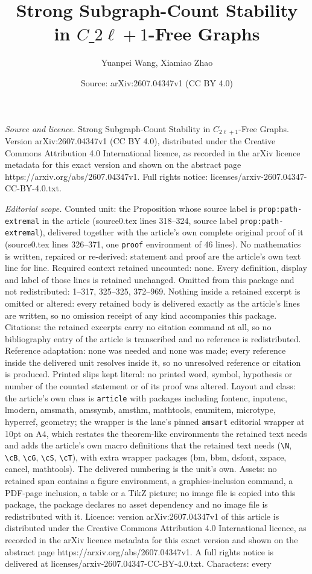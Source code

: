 \documentclass[10pt,a4paper]{amsart}
\title[Strong Subgraph-Count Stability in $C\_{2\ell+1}$-Free Graphs]{Strong Subgraph-Count Stability in $C\_{2\ell+1}$-Free Graphs}
\author{Yuanpei Wang, Xiamiao Zhao}
\date{Source: arXiv:2607.04347v1 (CC BY 4.0)}
\begin{document}
\maketitle

\noindent\emph{Source and licence.} Strong Subgraph-Count Stability in $C_{2\ell+1}$-Free Graphs. Version arXiv:2607.04347v1 (CC BY 4.0), distributed under the Creative Commons Attribution 4.0 International licence, as recorded in the arXiv licence metadata for this exact version and shown on the abstract page https://arxiv.org/abs/2607.04347v1. Full rights notice: licenses/arxiv-2607.04347-CC-BY-4.0.txt.\par\smallskip

\noindent\textit{Editorial scope.} Counted unit: the Proposition whose source label is \texttt{prop:path-extremal} in the article (source0.tex lines 318--324, source label \texttt{prop:path-extremal}), delivered together with the article's own complete original proof of it (source0.tex lines 326--371, one \texttt{proof} environment of 46 lines). No mathematics is written, repaired or re-derived: statement and proof are the article's own text line for line. Required context retained uncounted: none. Every definition, display and label of those lines is retained unchanged. Omitted from this package and not redistributed: 1--317, 325--325, 372--969. Nothing inside a retained excerpt is omitted or altered: every retained body is delivered exactly as the article's lines are written, so no omission receipt of any kind accompanies this package. Citations: the retained excerpts carry no citation command at all, so no bibliography entry of the article is transcribed and no reference is redistributed. Reference adaptation: none was needed and none was made; every reference inside the delivered unit resolves inside it, so no unresolved reference or citation is produced. Printed slips kept literal: no printed word, symbol, hypothesis or number of the counted statement or of its proof was altered. Layout and class: the article's own class is \texttt{article} with packages including fontenc, inputenc, lmodern, amsmath, amssymb, amsthm, mathtools, enumitem, microtype, hyperref, geometry; the wrapper is the lane's pinned \texttt{amsart} editorial wrapper at 10pt on A4, which restates the theorem-like environments the retained text needs and adds the article's own macro definitions that the retained text needs (\texttt{\textbackslash N}, \texttt{\textbackslash cB}, \texttt{\textbackslash cG}, \texttt{\textbackslash cS}, \texttt{\textbackslash cT}), with extra wrapper packages (bm, bbm, dsfont, xspace, cancel, mathtools). The delivered numbering is the unit's own. Assets: no retained span contains a figure environment, a graphics-inclusion command, a PDF-page inclusion, a table or a TikZ picture; no image file is copied into this package, the package declares no asset dependency and no image file is redistributed with it. Licence: version arXiv:2607.04347v1 of this article is distributed under the Creative Commons Attribution 4.0 International licence, as recorded in the arXiv licence metadata for this exact version and shown on the abstract page https://arxiv.org/abs/2607.04347v1. A full rights notice is delivered at licenses/arxiv-2607.04347-CC-BY-4.0.txt. Characters: every 
\end{document}
